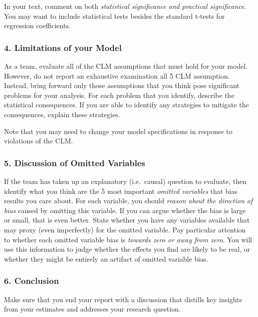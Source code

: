 \documentclass[
]{article}
\begin{document}
In your text, comment on both \emph{statistical significance and
practical significance}. You may want to include statistical tests
besides the standard t-tests for regression coefficients.

\hypertarget{limitations-of-your-model}{%
\subsubsection{4. Limitations of your
Model}\label{limitations-of-your-model}}

As a team, evaluate all of the CLM assumptions that must hold for your
model. However, do not report an exhaustive examination all 5 CLM
assumption. Instead, bring forward only those assumptions that you think
pose significant problems for your analysis. For each problem that you
identify, describe the statistical consequences. If you are able to
identify any strategies to mitigate the consequences, explain these
strategies.

Note that you may need to change your model specifications in response
to violations of the CLM.

\hypertarget{discussion-of-omitted-variables}{%
\subsubsection{5. Discussion of Omitted
Variables}\label{discussion-of-omitted-variables}}

If the team has taken up an explanatory (i.e.~causal) question to
evaluate, then identify what you think are the 5 most important
\emph{omitted variables} that bias results you care about. For each
variable, you should \emph{reason about the direction of bias} caused by
omitting this variable. If you can argue whether the bias is large or
small, that is even better. State whether you have any variables
available that may proxy (even imperfectly) for the omitted variable.
Pay particular attention to whether each omitted variable bias is
\emph{towards zero or away from zero}. You will use this information to
judge whether the effects you find are likely to be real, or whether
they might be entirely an artifact of omitted variable bias.

\hypertarget{conclusion}{%
\subsubsection{6. Conclusion}\label{conclusion}}

Make sure that you end your report with a discussion that distills key
insights from your estimates and addresses your research question.
\end{document}
